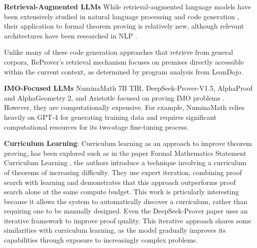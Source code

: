 \documentclass{article} %
\begin{document}
\textbf{Retrieval-Augmented LLMs} While retrieval-augmented language models have been extensively studied in natural language processing and code generation \citep{hayatiRetrievalBasedNeuralCode2018, parvezRetrievalAugmentedCode2021, luReACCRetrievalAugmentedCode2022, zhouDocPromptingGeneratingCode2023, shrivastavaRepositoryLevelPromptGeneration2023, zhangRepoCoderRepositoryLevelCode2023, dingCoCoMICCodeCompletion2023}, their application to formal theorem proving is relatively new, although relevant architectures have been researched in NLP \citep{khandelwalGeneralizationMemorizationNearest2020, guuRetrievalAugmentedLanguage2020, lewisRetrievalAugmentedGenerationKnowledgeIntensive2021, borgeaudImprovingLanguageModels2022, liDecoupledContextProcessing2022, jiangRetrievalAttentionEndtoend2022, wuMemorizingTransformers2022, izacardAtlasFewshotLearning2022, zhongTrainingLanguageModels2022}.

Unlike many of these code generation approaches that retrieve from general corpora, ReProver's retrieval mechanism focuses on premises directly accessible within the current context, as determined by program analysis from LeanDojo.


\textbf{IMO-Focused LLMs} NuminaMath 7B TIR, DeepSeek-Prover-V1.5, AlphaProof and AlphaGeometry 2, and Aristotle focused on proving IMO problems \citep{numina_math_7b, xinDeepSeekProverV1HarnessingProof2024a, alphaprofGeometry2024, harmonicAristotle2024}. However, they are computationally expensive. For example, NuminaMath relies heavily on GPT-4 for generating training data and requires significant computational resources for its two-stage fine-tuning process. 

\textbf{Curriculum Learning}: Curriculum learning as an approach to improve theorem proving, has been explored such as in the paper Formal Mathematics Statement Curriculum Learning \citep{}, the authors introduce a technique involving a curriculum of theorems of increasing difficulty. They use expert iteration, combining proof search with learning and demonstrates that this approach outperforms proof search alone at the same compute budget. This work is prticularly interesting because it allows the system to automatically discover a curriculum, rather than requiring one to be manually designed. Even the DeepSeek-Prover paper \citep{xinDeepSeekProverV1HarnessingProof2024a} uses an iterative framework to improve proof quality. This iterative approach shares some similarities with curriculum learning, as the model gradually improves its capabilities through exposure to increasingly complex problems.
\end{document}
